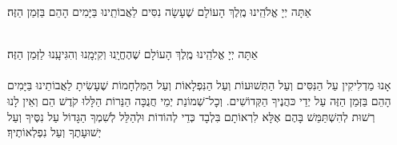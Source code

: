 \documentclass[twoside, openany, parskip=half, 11pt]{book}
\begin{document}
אַתָּה יְיָ אֱלֹהֵֽינוּ מֶֽלֶךְ הָעוֹלָם שֶׁעָשָׂה נִסִּים לַאֲבוֹתֵֽינוּ בַּיָּמִים הָהֵם בַּזְּמַן הַזֶּה׃

\\
אַתָּה יְיָ אֱלֹהֵֽינוּ מֶֽלֶךְ הָעוֹלָם שֶׁהֶחֱיָֽנוּ וְקִיְּמָֽנוּ וְהִגִּיעָֽנוּ לַזְּמַן הַזֶּה׃\\

\\
אָנוּ מַדְלִיקִין
עַל הַנִּסִּים וְעַל הַתְּשׁוּעוֹת
וְעַל הַנִּפְלָאוֹת
וְעַל הַמִּלְחָמוֹת
שֶׁעָשִׂיתָ לַאֲבוֹתֵינוּ
בַּיָּמִים הָהֵם בַּזְּמַן הַזֶּה
עַל יְדֵי כּהֲנֶיךָ הַקְּדוֹשִׁים.
וְכׇל־שְׁמוֹנַת יְמֵי חֲנֻכָּה
הַנֵּרוֹת הַלָּלוּ קֹדֶשׁ הֵם
וְאֵין לָנוּ רְשׁוּת לְהִשְׁתַּמֵּשׁ בָּהֶם
אֶלָּא לִרְאוֹתָם בִּלְבָד
כְּדֵי לְהוֹדוֹת וּלְהַלֵּל לְשִׁמְךָ הַגָּדוֹל
עַל נִסֶּיךָ וְעַל יְשׁוּעָתֶךָ
וְעַל נִפְלְאוֹתֶיךָ׃
\end{document}
